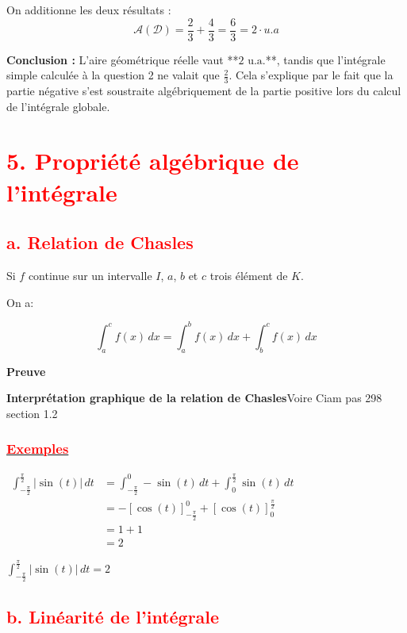 \documentclass[12pt,a4paper]{article}
\begin{document}
On additionne les deux résultats :
\[ \mathcal{A}(\mathcal{D}) = \frac{2}{3} + \frac{4}{3} = \frac{6}{3} = 2 \cdot u.a \]

\textbf{Conclusion :} L'aire géométrique réelle vaut **$2 \text{ u.a.}$**, tandis que l'intégrale simple calculée à la question 2 ne valait que $\frac{2}{3}$. Cela s'explique par le fait que la partie négative s'est soustraite algébriquement de la partie positive lors du calcul de l'intégrale globale.
 

\section*{\textbf{\textcolor{red}{5. Propriété algébrique de l'intégrale}}}
\subsection*{\textbf{\textcolor{red}{a. Relation de Chasles}}}

Si  \( f \) continue sur un intervalle  \( I \), $a$, $b$ et $c$ trois élément de $K$.

On a:

\[
\int_a^c f(x) \, dx = \int_a^b f(x) \, dx + \int_b^c f(x) \, dx
\]


\textbf{Preuve}

\textbf{Interprétation graphique de la relation de Chasles}Voire Ciam pas 298 section 1.2  

\subsubsection*{\underline{\textbf{\textcolor{red}{Exemples}}}}

\(
\begin{aligned}
\int_{-\frac{\pi}{2}}^{\frac{\pi}{2}} \left| \sin(t) \right| \, dt &= \int_{-\frac{\pi}{2}}^{0} -\sin(t) \, dt + \int_{0}^{\frac{\pi}{2}} \sin(t) \, dt\\
&= -\left[\cos(t) \right]_{-\frac{\pi}{2}}^{0} + \left[ \cos(t) \right]_{0}^{\frac{\pi}{2}}\\
&=1+1\\
&=2
\end{aligned}
\)

\( \int_{-\frac{\pi}{2}}^{\frac{\pi}{2}} \left| \sin(t) \right| \, dt = 2 \)

\subsection*{\textbf{\textcolor{red}{b. Linéarité de l'intégrale}}}
\end{document}
